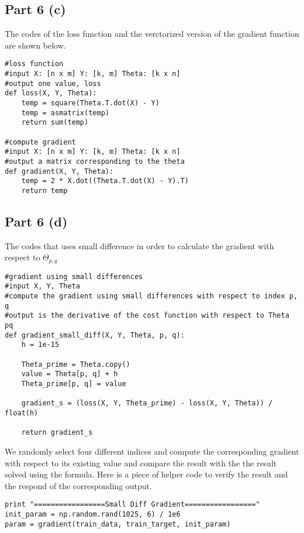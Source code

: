 \documentclass{article}
\begin{document}
\begin{part6}
\subsection{Part 6 (c)}

The codes of the loss function and the verctorized version of the gradient function are shown below.

\begin{verbatim}
#loss function
#input X: [n x m] Y: [k, m] Theta: [k x n]
#output one value, loss
def loss(X, Y, Theta):
    temp = square(Theta.T.dot(X) - Y)
    temp = asmatrix(temp)
    return sum(temp)

#compute gradient
#input X: [n x m] Y: [k, m] Theta: [k x n]
#output a matrix corresponding to the theta
def gradient(X, Y, Theta):
    temp = 2 * X.dot((Theta.T.dot(X) - Y).T)
    return temp
\end{verbatim}


\subsection{Part 6 (d)}

The codes that uses small difference in order to calculate the gradient with respect to $\Theta_{p, q}$

\begin{verbatim}
#gradient using small differences
#input X, Y, Theta
#compute the gradient using small differences with respect to index p, q
#output is the derivative of the cost function with respect to Theta pq
def gradient_small_diff(X, Y, Theta, p, q):
    h = 1e-15

    Theta_prime = Theta.copy()
    value = Theta[p, q] + h
    Theta_prime[p, q] = value
      
    gradient_s = (loss(X, Y, Theta_prime) - loss(X, Y, Theta)) / float(h)
    
    return gradient_s
\end{verbatim}

\newpage
We randomly select four different indices and compute the corresponding gradient with respect to its existing value and compare the result with the the result solved using the formula. Here is a piece of helper code to verify the result and the respond of the corresponding output.

\begin{verbatim}
print "=================Small Diff Gradient================="
init_param = np.random.rand(1025, 6) / 1e6
param = gradient(train_data, train_target, init_param)


\end{verbatim}
\end{part6}
\end{document}
